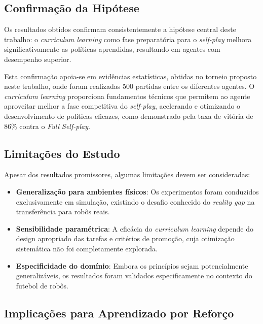 \subsection{Confirmação da Hipótese}

Os resultados obtidos confirmam consistentemente a hipótese central deste trabalho: o \textit{curriculum learning} como fase preparatória para o \textit{self-play} melhora significativamente as políticas aprendidas, resultando em agentes com desempenho superior.

Esta confirmação apoia-se em evidências estatísticas, obtidas no torneio proposto neste trabalho, onde foram realizadas 500 partidas entre os diferentes agentes. O \textit{curriculum learning} proporciona fundamentos técnicos que permitem ao agente aproveitar melhor a fase competitiva do \textit{self-play}, acelerando e otimizando o desenvolvimento de políticas eficazes, como demonstrado pela taxa de vitória de 86\% contra o \textit{Full Self-play}.

\subsection{Limitações do Estudo}

Apesar dos resultados promissores, algumas limitações devem ser consideradas:

\begin{itemize}
    \item \textbf{Generalização para ambientes físicos}: Os experimentos foram conduzidos exclusivamente em simulação, existindo o desafio conhecido do \textit{reality gap} na transferência para robôs reais.
    
    \item \textbf{Sensibilidade paramétrica}: A eficácia do \textit{curriculum learning} depende do design apropriado das tarefas e critérios de promoção, cuja otimização sistemática não foi completamente explorada.
    
    \item \textbf{Especificidade do domínio}: Embora os princípios sejam potencialmente generalizáveis, os resultados foram validados especificamente no contexto do futebol de robôs.
\end{itemize}

\subsection{Implicações para Aprendizado por Reforço}

